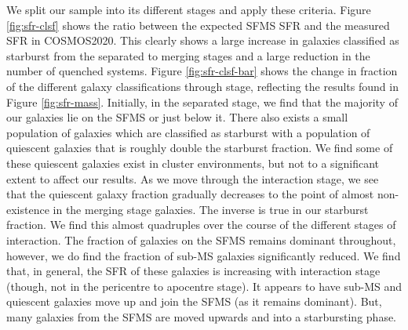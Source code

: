 \noindent We split our sample into its different stages and apply these criteria. Figure \ref{fig:sfr-clsf} shows the ratio between the expected SFMS SFR and the measured SFR in COSMOS2020. This clearly shows a large increase in galaxies classified as starburst from the separated to merging stages and a large reduction in the number of quenched systems. Figure \ref{fig:sfr-clsf-bar} shows the change in fraction of the different galaxy classifications through stage, reflecting the results found in Figure \ref{fig:sfr-mass}. Initially, in the separated stage, we find that the majority of our galaxies lie on the SFMS or just below it. There also exists a small population of galaxies which are classified as starburst with a population of quiescent galaxies that is roughly double the starburst fraction. We find some of these quiescent galaxies exist in cluster environments, but not to a significant extent to affect our results. As we move through the interaction stage, we see that the quiescent galaxy fraction gradually decreases to the point of almost non-existence in the merging stage galaxies. The inverse is true in our starburst fraction. We find this almost quadruples over the course of the different stages of interaction. The fraction of galaxies on the SFMS remains dominant throughout, however, we do find the fraction of sub-MS galaxies significantly reduced. We find that, in general, the SFR of these galaxies is increasing with interaction stage (though, not in the pericentre to apocentre stage). It appears to have sub-MS and quiescent galaxies move up and join the SFMS (as it remains dominant). But, many galaxies from the SFMS are moved upwards and into a starbursting phase.

